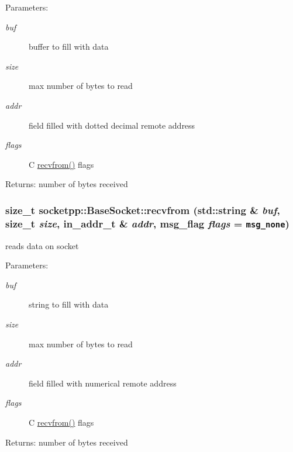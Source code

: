 \begin{CompactItemize}
\begin{Desc}
\item[Parameters:]
\begin{description}
\item[{\em buf}]buffer to fill with data \item[{\em size}]max number of bytes to read \item[{\em addr}]field filled with dotted decimal remote address \item[{\em flags}]C \hyperlink{classsocketpp_1_1BaseSocket_6a207860c0a1328dc05bea32bb62e81f}{recvfrom()} flags \end{description}
\end{Desc}
\begin{Desc}
\item[Returns:]number of bytes received \end{Desc}
\hypertarget{classsocketpp_1_1BaseSocket_723f0c1b9325ef3be7c97f520e6bc775}{
\subsubsection[{recvfrom}]{\setlength{\rightskip}{0pt plus 5cm}size\_\-t socketpp::BaseSocket::recvfrom (std::string \& {\em buf}, \/  size\_\-t {\em size}, \/  in\_\-addr\_\-t \& {\em addr}, \/  msg\_\-flag {\em flags} = {\tt msg\_\-none})}}
\label{classsocketpp_1_1BaseSocket_723f0c1b9325ef3be7c97f520e6bc775}


reads data on socket 

\begin{Desc}
\item[Parameters:]
\begin{description}
\item[{\em buf}]string to fill with data \item[{\em size}]max number of bytes to read \item[{\em addr}]field filled with numerical remote address \item[{\em flags}]C \hyperlink{classsocketpp_1_1BaseSocket_6a207860c0a1328dc05bea32bb62e81f}{recvfrom()} flags \end{description}
\end{Desc}
\begin{Desc}
\item[Returns:]number of bytes received \end{Desc}
\hypertarget{classsocketpp_1_1BaseSocket_0d4fad99bfe9601866a974f57c9f0370}{
}
\end{CompactItemize}
